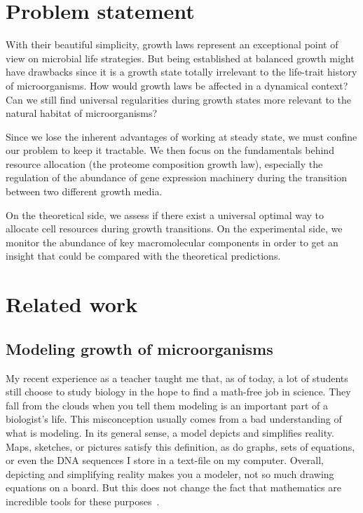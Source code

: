 \section{Problem statement}

With their beautiful simplicity, growth laws represent an exceptional point of view on microbial life strategies.
But being established at balanced growth might have drawbacks since it is a growth state totally irrelevant to the life-trait history of microorganisms.
How would growth laws be affected in a dynamical context?
Can we still find universal regularities during growth states more relevant to the natural habitat of microorganisms?

Since we lose the inherent advantages of working at steady state, we must confine our problem to keep it tractable.
We then focus on the fundamentals behind resource allocation (the proteome composition growth law), especially the regulation of the abundance of gene expression machinery during the transition between two different growth media.

On the theoretical side, we assess if there exist a universal optimal way to allocate cell resources during growth transitions.
On the experimental side, we monitor the abundance of key macromolecular components in order to get an insight that could be compared with the theoretical predictions.

\section{Related work}

\subsection{Modeling growth of microorganisms}

My recent experience as a teacher taught me that, as of today, a lot of students still choose to study biology in the hope to find a math-free job in science.
They fall from the clouds when you tell them modeling is an important part of a biologist's life.
This misconception usually comes from a bad understanding of what is modeling.
In its general sense, a model depicts and simplifies reality.
Maps, sketches, or pictures satisfy this definition, as do graphs, sets of equations, or even the DNA sequences I store in a text-file on my computer.
Overall, depicting and simplifying reality makes you a modeler, not so much drawing equations on a board.
But this does not change the fact that mathematics are incredible tools for these purposes~\cite{servedio_not_2014,mcgill_calm_2013}.

